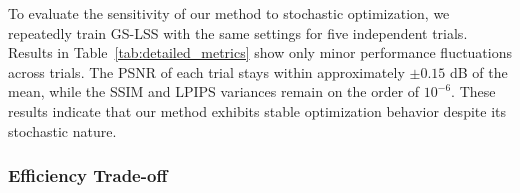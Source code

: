 \documentclass[lettersize,journal]{IEEEtran}
\begin{document}
To evaluate the sensitivity of our method to stochastic optimization, we repeatedly train GS-LSS with the same settings for five independent trials. Results in Table~\ref{tab:detailed_metrics} show only minor performance fluctuations across trials. The PSNR of each trial stays within approximately $\pm 0.15$ dB of the mean, while the SSIM and LPIPS variances remain on the order of $10^{-6}$. These results indicate that our method exhibits stable optimization behavior despite its stochastic nature.


\subsubsection{Efficiency Trade-off}


\end{document}
